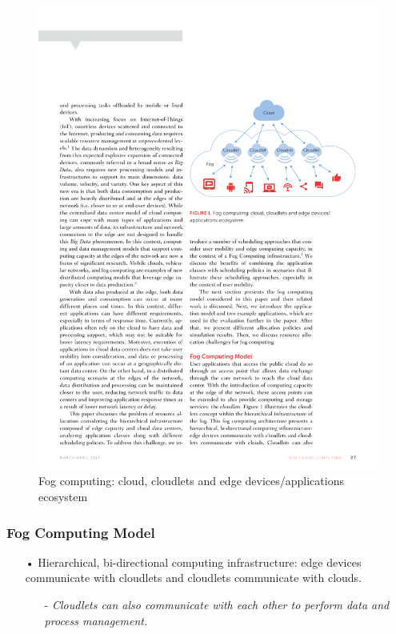 \documentclass[10pt, pdf, xcolor=pdftex, dvipsnames, table]{beamer}
\begin{document}
\begin{frame}
 	\begin{figure}[htbp]
 		\centerline{\includegraphics[scale=1]{images/fog.pdf}}
 		\caption[Fog computing: cloud, cloudlets and edge devices/applications ecosystem]{Fog computing: cloud, cloudlets and edge devices/applications ecosystem}
 	\end{figure}
\end{frame}

\begin{frame}
	\frametitle{Fog Computing Model}
 	\begin{block}{}
 		\begin{itemize}
 		     \item[•] Hierarchical, bi-directional computing infrastructure: edge devices communicate with cloudlets and cloudlets communicate with clouds.\newline
 		    	\begin{itemize}
 		    		\item[-] \footnotesize\textit{Cloudlets can also communicate with each other to perform data and process management.}
 		    	\end{itemize}
 		\end{itemize}
 	\end{block}
\end{frame}
\end{document}
